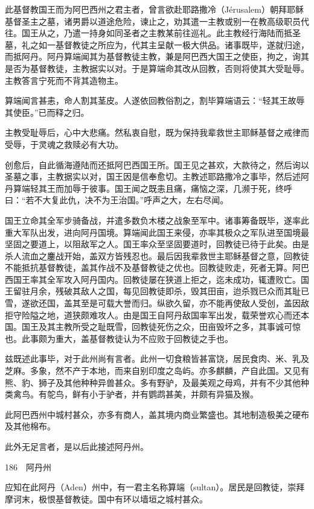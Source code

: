 \documentclass[12pt,UTF8]{ctexbook}
\begin{document}
此基督教国王而为阿巴西州之君主者，曾言欲赴耶路撒冷（Jérusalem）朝拜耶稣基督圣主之墓，诸男爵以道途危险，谏止之，劝其遣一主教或别一在教高级职员代往。国王从之，乃遣一持身如同圣者之主教某前往巡礼。此主教经行海陆而抵圣墓，礼之如一基督教徒之所应为，代其主呈献一极大供品。诸事既毕，遂就归途，而抵阿丹。阿丹算端闻其为基督教徒主教，兼是阿巴西大国王之使臣，拘之，询其是否为基督教徒，主教据实以对。于是算端命其改从回教，否则将使其大受耻辱。主教答言宁死而不背其造物主。

算端闻言甚恚，命人割其茎皮。人遂依回教俗割之，割毕算端语云：“轻其王故辱其使臣。”已而释之归。

主教受耻辱后，心中大悲痛。然私衷自慰，既为保持我辈救世主耶稣基督之戒律而受辱，于灵魂之救赎必有大功。

创愈后，自此循海遵陆而还抵阿巴西国王所。国王见之甚欢，大款待之，然后询以圣墓之事，主教据实以对，国王因是信奉愈切。主教述耶路撒冷之事毕，然后述阿丹算端轻其王而加辱于彼事。国王闻之既恚且痛，痛恼之深，几濒于死，终呼曰：“若不大复此仇，决不为王治国。”呼声之大，左右尽闻。

国王立命其全军步骑备战，并遣多数负木楼之战象至军中。诸事筹备既毕，遂率此重大军队出发，进向阿丹国境。算端闻此国王来侵，亦率其极众之军队进至国境最坚固之要道上，以阻敌军之人。国王率众至坚固要道时，回教徒已待于此矣。由是杀人流血之鏖战开始，盖双方皆残忍也。最后因我辈救世主耶稣基督之意，回教徒不能抵抗基督教徒，盖其作战不及基督教徒之优也。回教徒败走，死者无算。阿巴西国王率其全军攻入阿丹国内。回教徒屡在狭道上拒之，迄未成功，辄遭败亡。国王留驻月余，残破其敌人之国，每见回教徒即杀，毁其田亩，迨杀戮已众而其耻已雪，遂欲还国，盖其至是可载大誉而归。纵欲久留，亦不能再使敌人受创，盖因敌拒守险隘之地，道狭颇难攻人。由是国王自阿丹敌国率军出发，载荣誉欢心而还本国。国王及其主教所受之耻既雪，回教徒死伤之众，田亩毁坏之多，其事诚可惊也。此事颇为重大，盖基督教徒认为不应败于回教徒之手也。

兹既述此事毕，对于此州尚有言者。此州一切食粮皆甚富饶，居民食肉、米、乳及芝麻。多象，然不产于本地，而来自别印度之岛屿。亦多麒麟，产自此国。又见有熊、豹、狮子及其他种种异兽甚众。多有野驴，及最美观之母鸡，并有不少其他种类禽鸟。有鸵鸟，鲜有小于驴者，并有鹦鹉甚美，并颇有异猫及猴。

此阿巴西州中城村甚众，亦多有商人，盖其境内商业繁盛也。其地制造极美之硬布及其他棉布。

此外无足言者，是以后此接述阿丹州。





186　阿丹州

应知在此阿丹（Aden）州中，有一君主名称算端（sultan）。居民是回教徒，崇拜摩诃末，极恨基督教徒。国中有环以墙垣之城村甚众。
\end{document}
